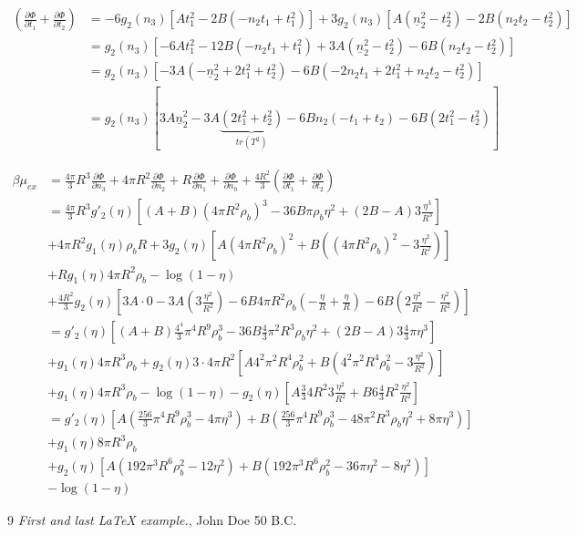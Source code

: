 \documentclass{article}
\begin{document}
\begin{align}
	\left( \frac{\partial \Phi}{\partial t_1} + \frac{\partial \Phi}{\partial t_2} \right) &= -6 g_2(n_3) \left[ A t_1^2 -2B(-n_2 t_1 + t_1^2) \right] + 3 g_2(n_3) \left[ A(\underline{n}_2^2 - t_2^2) - 2B(n_2 t_2 - t_2^2) \right] \\
	&= g_2(n_3) \left[ -6A t_1^2 -12B(-n_2 t_1 + t_1^2) + 3 A (\underline{n}_2^2 - t_2^2) - 6B(n_2 t_2 - t_2^2) \right] \\
	&= g_2(n_3) \left[ -3A(-\underline{n}_2^2 + 2 t_1^2 + t_2^2) - 6B (-2 n_2 t_1 +2 t_1^2 + n_2 t_2 - t_2^2) \right] \\
	&= g_2(n_3) \left[ 3A \underline{n}_2^2 - 3A \underbrace{(2 t_1^2 + t_2^2)}_{tr(T^2)} - 6B n_2 (-t_1 + t_2) - 6B (2 t_1^2 - t_2^2) \right]
\end{align}

\begin{align}
	\beta \mu_{ex} &= \frac{4 \pi}{3} R^3 \frac{\partial \Phi}{\partial n_3} + 4 \pi R^2 \frac{\partial \Phi}{\partial n_2} + R \frac{\partial \Phi}{\partial n_1} + \frac{\partial \Phi}{\partial n_0} + \frac{4 R^2}{3}\left( \frac{\partial \Phi}{\partial t_1} + \frac{\partial \Phi}{\partial t_2} \right) \\
	&= \frac{4 \pi}{3} R^3 g'_2(\eta) \left[ (A+B)(4\pi R^2 \rho_b)^3 - 36 B \pi \rho_b \eta^2 + (2B - A) 3 \frac{\eta^3}{R^3} \right] \\
	& + 4\pi R^2 g_1(\eta) \rho_b R + 3 g_2(\eta) \left[ A (4\pi R^2 \rho_b)^2 + B \left( (4 \pi R^2 \rho_b)^2 - 3 \frac{\eta^2}{R^2} \right) \right] \\
	&+ R g_1(\eta) 4 \pi R^2 \rho_b - \log(1-\eta) \\
	& + \frac{4 R^2}{3} g_2(\eta) \left[ 3A \cdot 0 - 3A \left( 3 \frac{\eta^2}{R^2} \right) - 6B 4\pi R^2 \rho_b \left( - \frac{\eta}{R} + \frac{\eta}{R}\right) - 6B \left( 2 \frac{\eta^2}{R^2} - \frac{\eta^2}{R^2}\right) \right] \\
	&= g'_2 (\eta) \left[ (A+B) \frac{4^4}{3} \pi^4 R^9 \rho_b^3 - 36 B \frac{4}{3} \pi^2 R^3 \rho_b \eta^2 + (2B-A) 3 \frac{4}{3} \pi \eta^3 \right] \\
	&+ g_1(\eta) 4 \pi R^3 \rho_b + g_2(\eta) 3 \cdot 4 \pi R^2 \left[ A 4^2 \pi^2 R^4 \rho_b^2 + B\left( 4^2 \pi^2 R^4 \rho_b^2 - 3 \frac{\eta^2}{R^2} \right) \right] \\
	&+ g_1(\eta) 4 \pi R^3 \rho_b - \log(1-\eta) - g_2(\eta) \left[ A \frac{3}{3} 4 R^2 3 \frac{\eta^2}{R^2} + B 6 \frac{4}{3} R^2 \frac{\eta^2}{R^2} \right] \\
	&= g'_2(\eta) \left[ A(\frac{256}{3} \pi^4 R^9 \rho_b^3 - 4 \pi \eta^3 ) + B (\frac{256}{3} \pi^4 R^9 \rho_b^3 - 48 \pi^2 R^3 \rho_b \eta^2 + 8 \pi \eta^3 ) \right] \\
	&+ g_1(\eta) 8 \pi R^3 \rho_b \\
	&+ g_2(\eta) \left[ A(192\pi^3 R^6 \rho_b^2 - 12 \eta^2) +B (192 \pi^3 R^6 \rho_b^2 - 36 \pi \eta^2 - 8 \eta^2 ) \right] \\
	&- \log(1-\eta)
\end{align}


\begin{thebibliography}{9}
 \emph{First and last \LaTeX{} example.},
John Doe 50 B.C. 
\end{thebibliography}
\end{document}
